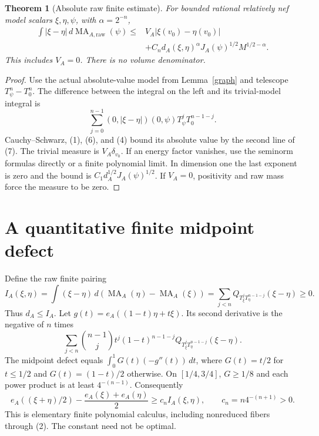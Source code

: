 \documentclass[11pt]{article}
\newtheorem{theorem}{Theorem}
\newcommand{\MA}{\operatorname{MA}}
\begin{document}
\begin{theorem}[Absolute raw finite estimate]\label{finiteabs}
For bounded rational relatively nef model scalars $\xi,\eta,\psi$,
with $\alpha=2^{-n}$,
\[
 \begin{split}
 \int|\xi-\eta|\,d\MA_{A,\mathrm{raw}}(\psi)
 \leq{}&V_A|\xi(v_0)-\eta(v_0)|\\
 &+C_n d_A(\xi,\eta)^\alpha J_A(\psi)^{1/2}
              M^{1/2-\alpha}.
 \end{split}                                             \tag{7}
\]
This includes $V_A=0$. There is no volume denominator.
\end{theorem}
\begin{proof}
Use the actual absolute-value model from Lemma~\ref{graph} and
telescope $T_\psi^n-T_0^n$. The difference between the integral
on the left and its trivial-model integral is
\[
 \sum_{j=0}^{n-1}(0,|\xi-\eta|)(0,\psi)T_\psi^jT_0^{n-1-j}.
\]
Cauchy--Schwarz, (1), (6), and (4) bound its absolute value by
the second line of (7). The trivial measure is $V_A\delta_{v_0}$.
If an energy factor vanishes, use the seminorm formulas directly
or a finite polynomial limit. In dimension one the last exponent
is zero and the bound is $C_1d_A^{1/2}J_A(\psi)^{1/2}$.
If $V_A=0$, positivity and raw mass force the measure to be zero.
\end{proof}

\section{A quantitative finite midpoint defect}
Define the raw finite pairing
\[
 I_A(\xi,\eta)=\int(\xi-\eta)\,
       d(\MA_A(\eta)-\MA_A(\xi))
   =\sum_{j<n}Q_{T_\xi^jT_\eta^{n-1-j}}(\xi-\eta)\geq0.
\]
Thus $d_A\leq I_A$. Let $g(t)=e_A((1-t)\eta+t\xi)$.
Its second derivative is the negative of $n$ times
\[
 \sum_{j<n}\binom{n-1}{j}t^j(1-t)^{n-1-j}
                       Q_{T_\xi^jT_\eta^{n-1-j}}(\xi-\eta).
\]
The midpoint defect equals $\int_0^1G(t)(-g''(t))\,dt$, where
$G(t)=t/2$ for $t\leq1/2$ and $G(t)=(1-t)/2$ otherwise.
On $[1/4,3/4]$, $G\geq1/8$ and each power product is at least
$4^{-(n-1)}$. Consequently
\[
 e_A((\xi+\eta)/2)-\frac{e_A(\xi)+e_A(\eta)}2
       \geq c_n I_A(\xi,\eta),\qquad c_n=n4^{-(n+1)}>0.    \tag{8}
\]
This is elementary finite polynomial calculus, including nonreduced
fibers through (2). The constant need not be optimal.
\end{document}
